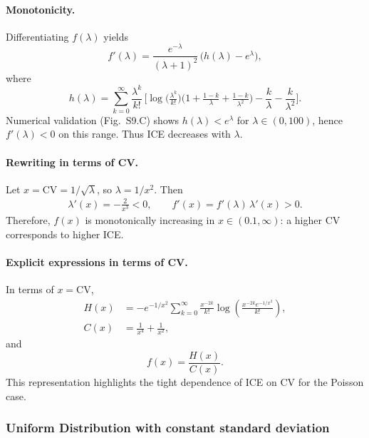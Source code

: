 \documentclass[11pt]{article}
\theoremstyle{remark}
\theoremstyle{definition}
\begin{document}
\paragraph{Monotonicity.}
Differentiating $f(\lambda)$ yields
\begin{equation}
f'(\lambda) = \frac{e^{-\lambda}}{(\lambda+1)^2}\,\Big(h(\lambda)-e^\lambda\Big),
\end{equation}
where
\begin{equation}
h(\lambda) = \sum_{k=0}^\infty \frac{\lambda^k}{k!}\,
\Bigg[\log\!\Big(\tfrac{\lambda^k}{k!}\Big)\Big(1+\tfrac{1-k}{\lambda}+\tfrac{1-k}{\lambda^2}\Big)
 - \frac{k}{\lambda} - \frac{k}{\lambda^2}\Bigg].
\end{equation}
Numerical validation (Fig.~S9.C) shows $h(\lambda)<e^\lambda$ for $\lambda\in(0,100)$, hence $f'(\lambda)<0$ on this range.  
Thus ICE decreases with $\lambda$.

\paragraph{Rewriting in terms of CV.}
Let $x=\mathrm{CV}=1/\sqrt{\lambda}$, so $\lambda=1/x^2$. Then
\begin{align}
\lambda'(x)=-\frac{2}{x^3}<0, \qquad f'(x)=f'(\lambda)\,\lambda'(x)>0.
\end{align}
Therefore, $f(x)$ is monotonically increasing in $x\in(0.1,\infty)$: a higher CV corresponds to higher ICE.

\paragraph{Explicit expressions in terms of CV.}
In terms of $x=\mathrm{CV}$,
\begin{align}
H(x) &= -e^{-1/x^2}\sum_{k=0}^\infty \frac{x^{-2k}}{k!}
\log\!\left(\frac{x^{-2k} e^{-1/x^2}}{k!}\right), \label{eq:poisson-hx}\\
C(x) &= \frac{1}{x^4}+\frac{1}{x^2}, \label{eq:poisson-cx}
\end{align}
and
\begin{equation}
f(x) = \frac{H(x)}{C(x)}.
\label{eq:poisson-fx}
\end{equation}
This representation highlights the tight dependence of ICE on CV for the Poisson case.

\subsubsection{Uniform Distribution with constant standard deviation}
\end{document}
